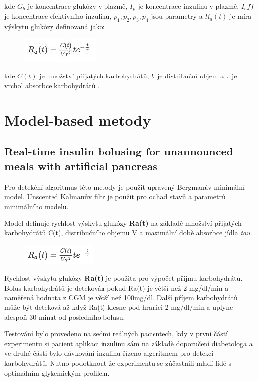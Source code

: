 \noindent kde $G_b$ je koncentrace glukózy v plazmě, $I_p$ je koncentrace inzulinu v plazmě, $I_eff$ je koncentrace efektivního inzulinu, $p_1, p_2, p_3, p_4$ jsou parametry a $R_a (t)$ je míra výskytu glukózy definovaná jako:

\begin{figure}[H]{
\label{fig:bergman2}
\includegraphics{img/analyza/bergman2.jpg}}
\end{figure}

\noindent kde $C(t)$ je množství přijatých karbohydrátů, $V$  je distribuční objem a $\tau$ je vrchol absorbce karbohydrátů \citep{Analyza.Bergman,Analyza.Turksoy}.


\section{Model-based metody}
\subsection{Real-time insulin bolusing for unannounced meals with artificial pancreas \citep{Analyza.Turksoy}}
\label{ch:turksoy}

Pro detekční algoritmus této metody je použit upravený Bergmanův minimální model. Unscented Kalmanův filtr je použit pro odhad stavů a parametrů minimálního modelu.

Model definuje rychlost výskytu glukózy \textbf{Ra(t)} na základě množství přijatých karbohydrátů C(t), distribučního objemu V a maximální době absorbce jídla \textit{tau}.

\begin{figure}[H]{
\label{fig:turksoy1}
\includegraphics{img/analyza/turksoy1.png}}
\end{figure}

Rychlost výskytu glukózy \textbf{Ra(t)} je použita pro výpočet příjmu karbohydrátů. Bolus karbohydrátů je detekován pokud Ra(t) je větší než 2 mg/dl/min a naměřená hodnota z CGM je větší než 100mg/dl. Další příjem karbohydrátů může být deteková až když Ra(t) klesne pod hranici 2 mg/dl/min a uplyne alespoň 30 minut od posledního bolusu.

Testování bylo provedeno na sedmi reálných pacientech, kdy v první částí experimentu si pacient aplikaci inzulinu sám na základě doporučení diabetologa a ve druhé části bylo dávkování inzulinu řízeno algoritmem pro detekci karbohydrátů. Nutno podotknout že experimentu se zúčastnili mladí lidé s optimálním glykemickým profilem.

